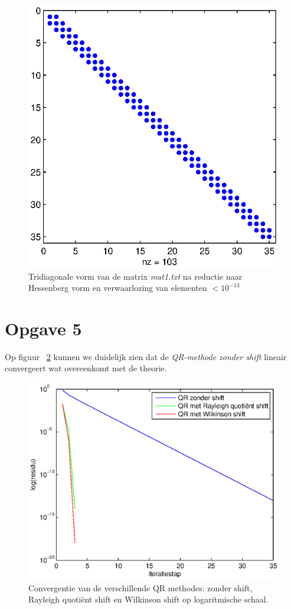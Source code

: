 \documentclass[a4paper]{article}
\newcommand{\opgave}[1]{\section*{Opgave #1}}
\begin{document}
\begin{figure}[H]
\begin{minipage}[t]{0.45\linewidth}
\centerline{\includegraphics[scale=0.45]{pictures/opgave4Hessenberg2.eps}}
\caption{Tridiagonale vorm van de matrix \textit{mat1.txt} na reductie naar Hessenberg vorm en verwaarlozing van elementen $<10^{-13}$}
\label{fig:figure2}
\end{minipage}
\end{figure}
\opgave{5}
Op figuur ~\ref{fig:opgave5} kunnen we duidelijk zien dat de \textit{QR-methode zonder shift} lineair convergeert wat overeenkomt met de theorie.
\begin{figure}
\centerline{\includegraphics{pictures/opgave5grafiek.eps}}
\caption{Convergentie van de verschillende QR methodes: zonder shift, Rayleigh quoti\"{e}nt shift en Wilkinson shift op logaritmische schaal.}
\label{fig:opgave5}
\end{figure}
\end{document}
